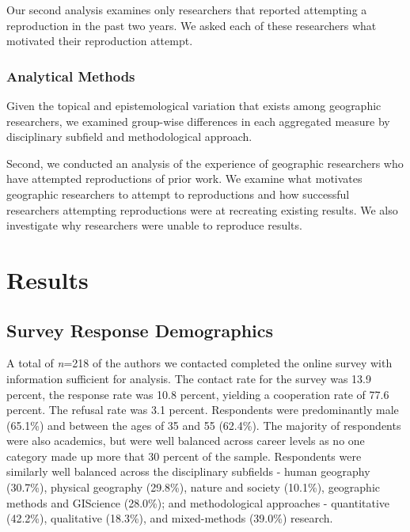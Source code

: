 \documentclass[]{interact}
\theoremstyle{plain}%
\theoremstyle{definition}
\theoremstyle{remark}
\begin{document}
Our second analysis examines only researchers that reported attempting a reproduction in the past two years. 
We asked each of these researchers what motivated their reproduction attempt. 

\subsubsection*{Analytical Methods}
Given the topical and epistemological variation that exists among geographic researchers, we examined group-wise differences in each aggregated measure by disciplinary subfield and methodological approach.

Second, we conducted an analysis of the experience of geographic researchers who have attempted reproductions of prior work. 
We examine what motivates geographic researchers to attempt to reproductions and how successful researchers attempting reproductions were at recreating existing results. 
We also investigate why researchers were unable to reproduce results.


\section*{Results}

\subsection*{Survey Response Demographics}
A total of \textit{n}=218 of the authors we contacted completed the online survey with information sufficient for analysis. 
The contact rate for the survey was 13.9 percent, the response rate was 10.8 percent, yielding a cooperation rate of 77.6 percent. 
The refusal rate was 3.1 percent.
Respondents were predominantly male (65.1\%) and between the ages of 35 and 55 (62.4\%). 
The majority of respondents were also academics, but were well balanced across career levels as no one category made up more that 30 percent of the sample.
Respondents were similarly well balanced across the disciplinary subfields - human geography (30.7\%), physical geography (29.8\%), nature and society (10.1\%), geographic methods and GIScience (28.0\%); and methodological approaches - quantitative (42.2\%), qualitative (18.3\%), and mixed-methods (39.0\%) research.
\end{document}
